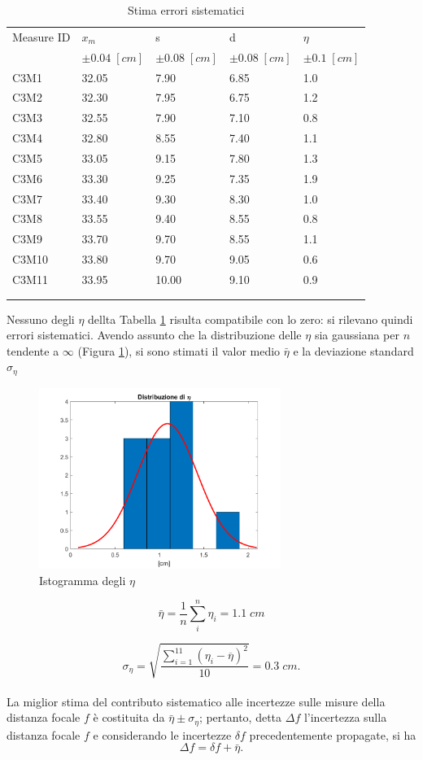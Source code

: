 \documentclass[11pt,a4paper]{article}
\begin{document}
\begin{longtable}{@{}lllll@{}}
\toprule
Measure ID & $x_m$ & s & d & $\eta$ \tabularnewline
& $\pm 0.04 \; [cm]$ & $\pm 0.08 \; [cm]$ & $\pm 0.08 \; [cm]$ & $\pm 0.1 \; [cm]$ \tabularnewline
\midrule
C3M1 & 32.05 & 7.90 & 6.85 & 1.0 \tabularnewline
C3M2 & 32.30 & 7.95 & 6.75 & 1.2 \tabularnewline
C3M3 & 32.55 & 7.90 & 7.10 & 0.8 \tabularnewline
C3M4 & 32.80 & 8.55 & 7.40 & 1.1 \tabularnewline
C3M5 & 33.05 & 9.15 & 7.80 & 1.3 \tabularnewline
C3M6 & 33.30 & 9.25 & 7.35 & 1.9 \tabularnewline
C3M7 & 33.40 & 9.30 & 8.30 & 1.0 \tabularnewline
C3M8 & 33.55 & 9.40 & 8.55 & 0.8 \tabularnewline
C3M9 & 33.70 & 9.70 & 8.55 & 1.1 \tabularnewline
C3M10 & 33.80 & 9.70 & 9.05 & 0.6 \tabularnewline
C3M11 & 33.95 & 10.00 & 9.10 & 0.9 \tabularnewline
\bottomrule
    \label{tab:sd}
    \\
    \caption{Stima errori sistematici}
 \end{longtable}
Nessuno degli $\eta$ dellta Tabella \ref{tab:sd} risulta compatibile con lo zero: si rilevano quindi errori sistematici. Avendo assunto che la distribuzione delle $\eta$ sia gaussiana per $n$ tendente a $\infty$ (Figura \ref{fig:eta}), si sono stimati il valor medio $\bar{\eta}$ e la deviazione standard $\sigma_{\eta}$
\begin{figure}[H]
    \centering
    \includegraphics[width=0.7\textwidth]{eta.png}
    \caption{Istogramma degli $\eta$}
    \label{fig:eta}
\end{figure}


\begin{equation}
    \bar{\eta} = \frac{1}{n} \sum_i^n \eta_i = 1.1 \; cm
    \label{eq:eta-sist}
\end{equation}

\begin{equation}
    \sigma_{\eta} = \sqrt{\frac{{\sum_{i=1}^{11}(\eta_i - \overline{\eta})^2}}{{10}}} = 0.3 \; cm.
\end{equation}
\\
La miglior stima del contributo sistematico alle incertezze sulle misure della distanza focale $f$ è costituita da $\bar{\eta} \pm \sigma_{\eta}$; pertanto, detta $\Delta f$ l'incertezza sulla distanza focale $f$ e considerando le incertezze $\delta f$ precedentemente propagate, si ha 
\begin{equation}
    \Delta f = \delta f + \bar{\eta}.
\end{equation}
\end{document}

